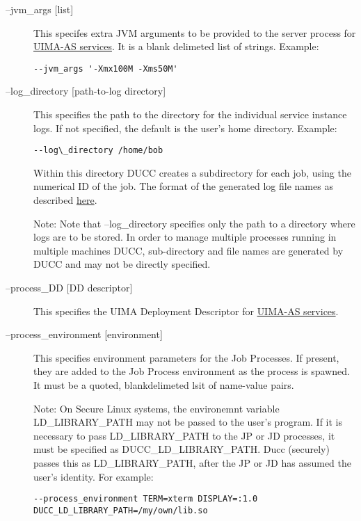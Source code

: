 \begin{description}
        \item[--jvm\_args {[list]} ]        
          This specifes extra JVM arguments to be provided to the server process for
          \hyperref[sec:services.types]{UIMA-AS services}. It is a blank delimeted 
            list of strings. Example: 
\begin{verbatim}
--jvm_args '-Xmx100M -Xms50M' 
\end{verbatim}

          \item[--log\_directory {[path-to-log directory]}] This specifies the path to the directory for
            the individual service instance logs. If not specified, the default is the user's home
            directory. Example:
\begin{verbatim}
--log\_directory /home/bob 
\end{verbatim}
        
        Within this directory DUCC creates a subdirectory for each job, using the numerical 
        ID of the job. The format of the generated log file names as described
        \hyperref[chap:job-logs]{here}.
        
        Note: Note that --log\_directory specifies only the path to a directory where 
        logs are to be stored. In order to manage multiple processes running in multiple 
        machines DUCC, sub-directory and file names are generated by DUCC and may 
        not be directly specified. 

      \item[--process\_DD {[DD descriptor]}] 
        This specifies the UIMA Deployment Descriptor for \hyperref[sec:services.types]{UIMA-AS services}.

      \item[--process\_environment {[environment]}] This specifies environment parameters for the Job
        Processes. If present, they are added to the Job Process environment as the process is
        spawned. It must be a quoted, blankdelimeted lsit of name-value pairs.

        Note: On Secure Linux systems, the environemnt variable 
        LD\_LIBRARY\_PATH may not be passed to the user's program. If it is 
        necessary to pass LD\_LIBRARY\_PATH to the JP or JD processes, it must be 
        specified as DUCC\_LD\_LIBRARY\_PATH. Ducc (securely) passes this as 
        LD\_LIBRARY\_PATH, after the JP or JD has assumed the user's identity. For 
        example: 
\begin{verbatim}
--process_environment TERM=xterm DISPLAY=:1.0 DUCC_LD_LIBRARY_PATH=/my/own/lib.so
\end{verbatim}


\end{description}
